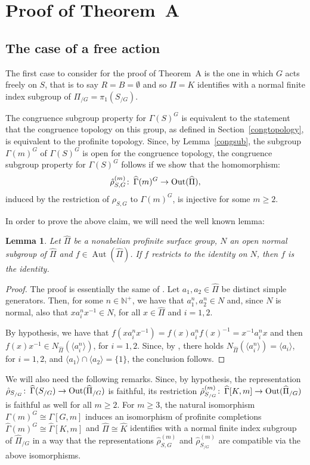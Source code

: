 \documentclass[12pt,twoside]{amsart}
\newtheorem{lemma}[theorem]{Lemma}
\theoremstyle{definition}
\newcommand{\N}{\mathbb{N}}
\def\Aut{\operatorname{Aut}}
\def\Out{\operatorname{Out}}
\def\la{\langle}
\def\ra{\rangle}
\def\hP{{\widehat\Pi}}
\def\G{{\Gamma}}
\def\hG{{\widehat\Gamma}}
\def\wh{\widehat}
\def\co{\colon\thinspace}
\begin{document}
\section{Proof of Theorem~A}
\subsection{The case of a free action}\label{freeaction}
The first case to consider for the proof of Theorem~A is the one in which $G$ acts freely on $S$, that is to say $R=B=\emptyset$ and so
$\Pi=K$ identifies with a normal finite index subgroup of $\Pi_{/G}=\pi_1(S_{/G})$. 

The congruence subgroup property for $\G(S)^G$ is equivalent to the statement that the congruence topology on this group, as defined 
in Section~\ref{congtopology}, is equivalent to the profinite topology. Since, by Lemma~\ref{congsub}, the subgroup $\G(m)^G$ of $\G(S)^G$ 
is open for the congruence topology, the congruence subgroup property for $\G(S)^G$ follows if we show that the homomorphism:
\[\hat\rho_{S,G}^{(m)}\co\hG(m)^G\to\Out(\hP),\]
induced by the restriction of $\rho_{S,G}$ to $\G(m)^G$, is injective for some $m\geq 2$. 

In order to prove the above claim, we will need the well known lemma: 

\begin{lemma}\label{restriction}Let $\hP$ be a nonabelian profinite surface group, $N$ an open normal subgroup of $\hP$ and $f\in\Aut(\hP)$.
If $f$ restricts to the identity on $N$, then $f$ is the identity.
\end{lemma}

\begin{proof}The proof is essentially the same of \cite[Lemma~8] {Asada}.
Let $a_1,a_2\in\hP$ be distinct simple generators. Then, for some $n\in\N^+$, we have that $a_1^n,a_2^n\in N$ and,
since $N$ is normal, also that $x a_i^n x^{-1}\in N$, for all $x\in\hP$ and $i=1,2$. 

By hypothesis, we have that $f(x a_i^n x^{-1})=f(x)a_i^n f(x)^{-1}=x^{-1}a_i^n x$ and then $f(x)x^{-1}\in N_\hP(\la a_i^n\ra)$, for $i=1,2$. 
Since, by \cite[Proposition~3.6]{Magnus}, there holds $N_\hP(\la a_i^n\ra)=\la a_i\ra$, for $i=1,2$, and $\la a_1\ra\cap\la a_2\ra=\{1\}$,
the conclusion follows.
\end{proof}

We will also need the following remarks.
Since, by hypothesis, the representation $\hat\rho_{S_{/G}}\co\hG(S_{/G})\to\Out(\hP_{/G})$ is faithful, its restriction 
$\hat\rho_{S_{/G}}^{(m)}\co\hG[K,m]\to\Out(\hP_{/G})$ is faithful as well for all $m\geq 2$.
For $m\geq 3$, the natural isomorphism $\G(m)^G\cong\G[G,m]$ induces an isomorphism of profinite completions 
$\hG(m)^G\cong\hG[K,m]$ and $\hP\cong\wh{K}$ identifies with a normal finite index subgroup of 
$\hP_{/G}$ in a way that the representations $\hat\rho_{S,G}^{(m)}$ and $\hat\rho_{S_{/G}}^{(m)}$ are compatible via the above isomorphisms.
\end{document}
